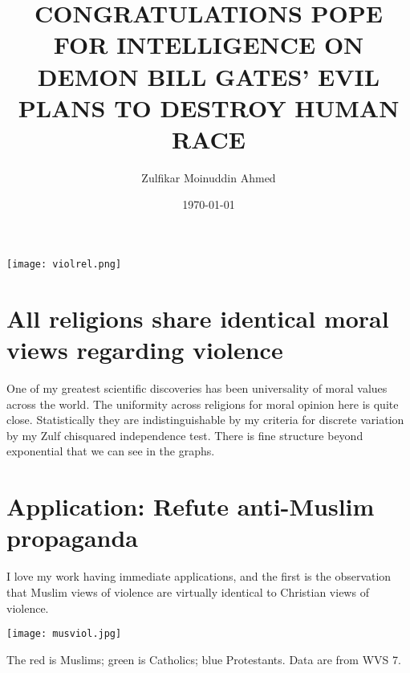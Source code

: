 \documentclass{amsart}
\title{CONGRATULATIONS POPE FOR INTELLIGENCE ON DEMON BILL GATES' EVIL PLANS TO DESTROY HUMAN RACE}
\author{Zulfikar Moinuddin Ahmed}
\date{\today}
\begin{document}
\maketitle

\texttt{[image: violrel.png]}

\section{All religions share identical moral views regarding violence}

One of my greatest scientific discoveries has been universality of moral values across the world.  The uniformity across religions for moral opinion here is quite close.  Statistically they are indistinguishable by my criteria for discrete variation by my Zulf chisquared independence test.  There is fine structure beyond exponential that we can see in the graphs.

\section{Application: Refute anti-Muslim propaganda}

I love my work having immediate applications, and the first is the observation that Muslim views of violence are virtually identical to Christian views of violence.

\texttt{[image: musviol.jpg]}

The red is Muslims; green is Catholics; blue Protestants.  Data are from WVS 7.
\end{document}
